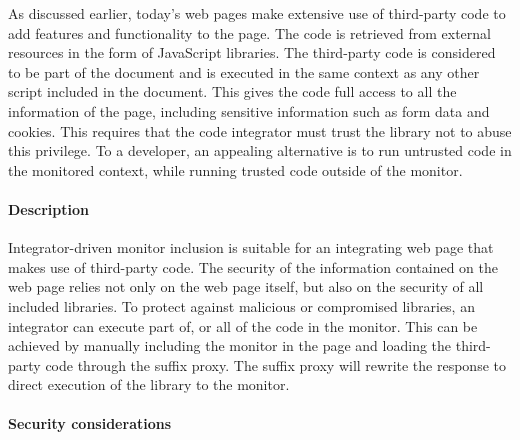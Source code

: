 \documentclass{llncs}
\begin{document}

As discussed earlier, today's
 web pages make extensive use of third-party code to add features 
and functionality to the page. The code is retrieved from external resources in 
the form of JavaScript libraries. The third-party code is considered to be part 
of the document and is executed in the same context as any other script 
included in the document. This gives the code full access to all the information 
of the page, including sensitive information such as form data and cookies. 
This requires that the code integrator must 
trust the library not to abuse this privilege. To a developer, an appealing alternative 
is to run untrusted code in the monitored context, while running trusted code outside of the 
monitor. 

\paragraph{Description}
Integrator-driven monitor inclusion is suitable for an integrating web page 
that makes use of third-party code.
The security of the information contained on the web 
page relies not only on the web page itself, but also on the security of all 
included libraries. To protect against malicious or compromised libraries, 
an integrator can execute part of, or all of the code in the monitor.
This can be achieved by manually including the monitor in the page and loading the 
third-party code through the suffix proxy. The suffix proxy will rewrite the 
response to direct execution of the library to the monitor. 

\paragraph{Security considerations}
\end{document}
